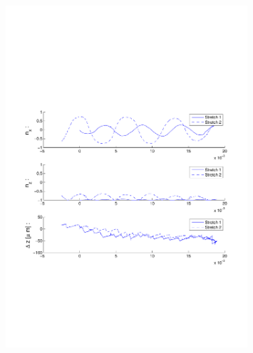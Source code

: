 \begin{figure}[H]

\centering

\includegraphics[width=0.8\textwidth]{Images/Particle 5/Stretch1.pdf}

\end{figure}

